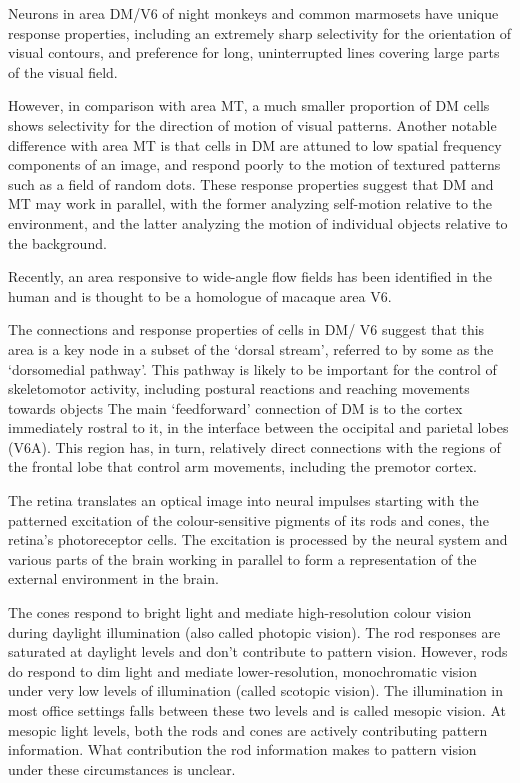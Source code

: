 Neurons in area DM/V6 of night monkeys and common marmosets have unique response properties, including an extremely sharp selectivity for the orientation of visual contours, and preference for long, uninterrupted lines covering large parts of the visual field.

However, in comparison with area MT, a much smaller proportion of DM cells shows selectivity for the direction of motion of visual patterns. Another notable difference with area MT is that cells in DM are attuned to low spatial frequency components of an image, and respond poorly to the motion of textured patterns such as a field of random dots. These response properties suggest that DM and MT may work in parallel, with the former analyzing self-motion relative to the environment, and the latter analyzing the motion of individual objects relative to the background.

Recently, an area responsive to wide-angle flow fields has been identified in the human and is thought to be a homologue of macaque area V6.

The connections and response properties of cells in DM/ V6 suggest that this area is a key node in a subset of the `dorsal stream', referred to by some as the `dorsomedial pathway'. This pathway is likely to be important for the control of skeletomotor activity, including postural reactions and reaching movements towards objects The main `feedforward' connection of DM is to the cortex immediately rostral to it, in the interface between the occipital and parietal lobes (V6A). This region has, in turn, relatively direct connections with the regions of the frontal lobe that control arm movements, including the premotor cortex.

The retina translates an optical image into neural impulses starting with the patterned excitation of the colour-sensitive pigments of its rods and cones, the retina's photoreceptor cells. The excitation is processed by the neural system and various parts of the brain working in parallel to form a representation of the external environment in the brain.

The cones respond to bright light and mediate high-resolution colour vision during daylight illumination (also called photopic vision). The rod responses are saturated at daylight levels and don't contribute to pattern vision. However, rods do respond to dim light and mediate lower-resolution, monochromatic vision under very low levels of illumination (called scotopic vision). The illumination in most office settings falls between these two levels and is called mesopic vision. At mesopic light levels, both the rods and cones are actively contributing pattern information. What contribution the rod information makes to pattern vision under these circumstances is unclear.

